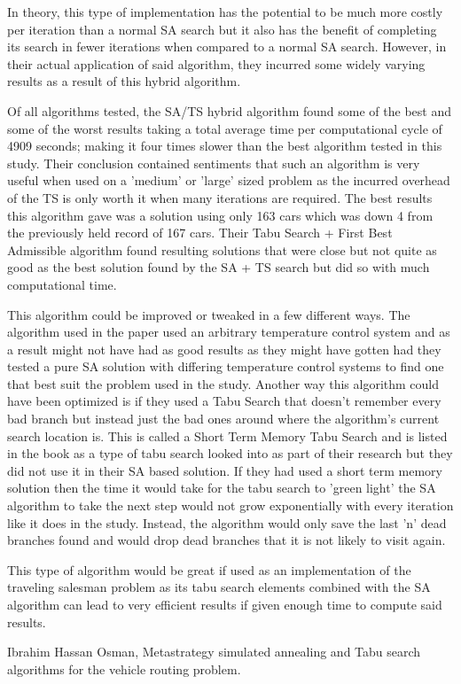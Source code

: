 \documentclass[11pt]{article}
\newcommand{\<}{\langle}
\renewcommand{\>}{\rangle}
\theoremstyle{definition}
\begin{document}
    In theory, this type of implementation has the potential to be much more costly per iteration than a normal SA search but it also has the benefit of completing its search in fewer iterations when compared to a normal SA search. However, in their actual application of said algorithm, they incurred some widely varying results as a result of this hybrid algorithm.
    
    Of all algorithms tested, the SA/TS hybrid algorithm found some of the best and some of the worst results taking a total average time per computational cycle of 4909 seconds; making it four times slower than the best algorithm tested in this study. Their conclusion contained sentiments that such an algorithm is very useful when used on a 'medium' or 'large' sized problem as the incurred overhead of the TS is only worth it when many iterations are required. The best results this algorithm gave was a solution using only 163 cars which was down 4 from the previously held record of 167 cars. Their Tabu Search + First Best Admissible algorithm found resulting solutions that were close but not quite as good as the best solution found by the SA + TS search but did so with much computational time.
    
    This algorithm could be improved or tweaked in a few different ways. The algorithm used in the paper used an arbitrary temperature control system and as a result might not have had as good results as they might have gotten had they tested a pure SA solution with differing temperature control systems to find one that best suit the problem used in the study. Another way this algorithm could have been optimized is if they used a Tabu Search that doesn't remember every bad branch but instead just the bad ones around where the algorithm's current search location is. This is called a Short Term Memory Tabu Search and is listed in the book as a type of tabu search looked into as part of their research but they did not use it in their SA based solution. If they had used a short term memory solution then the time it would take for the tabu search to 'green light' the SA algorithm to take the next step would not grow exponentially with every iteration  like it does in the study. Instead, the algorithm would only save the last 'n' dead branches found and would drop dead branches that it is not likely to visit again.
    
    This type of algorithm would be great if used as an implementation of the traveling salesman problem as its tabu search elements combined with the SA algorithm can lead to very efficient results if given enough time to compute said results.
    
    \begin{thebibliography}{9}
    Ibrahim Hassan Osman,
    Metastrategy simulated annealing and Tabu search
    algorithms for the vehicle routing problem.
    \end{thebibliography}
    
    
\end{document}
